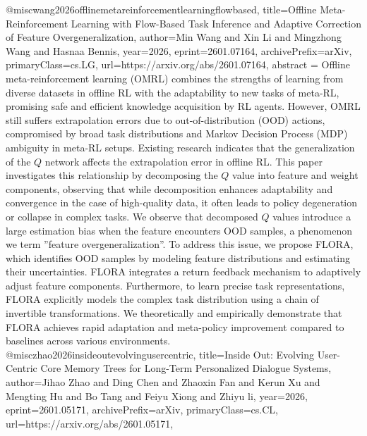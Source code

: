 {}@misc{wang2026offlinemetareinforcementlearningflowbased,
      title={Offline Meta-Reinforcement Learning with Flow-Based Task Inference and Adaptive Correction of Feature Overgeneralization}, 
      author={Min Wang and Xin Li and Mingzhong Wang and Hasnaa Bennis},
      year={2026},
      eprint={2601.07164},
      archivePrefix={arXiv},
      primaryClass={cs.LG},
      url={https://arxiv.org/abs/2601.07164},
      abstract = {Offline meta-reinforcement learning (OMRL) combines the strengths of learning from diverse datasets in offline RL with the adaptability to new tasks of meta-RL, promising safe and efficient knowledge acquisition by RL agents. However, OMRL still suffers extrapolation errors due to out-of-distribution (OOD) actions, compromised by broad task distributions and Markov Decision Process (MDP) ambiguity in meta-RL setups. Existing research indicates that the generalization of the $Q$ network affects the extrapolation error in offline RL. This paper investigates this relationship by decomposing the $Q$ value into feature and weight components, observing that while decomposition enhances adaptability and convergence in the case of high-quality data, it often leads to policy degeneration or collapse in complex tasks. We observe that decomposed $Q$ values introduce a large estimation bias when the feature encounters OOD samples, a phenomenon we term ''feature overgeneralization''. To address this issue, we propose FLORA, which identifies OOD samples by modeling feature distributions and estimating their uncertainties. FLORA integrates a return feedback mechanism to adaptively adjust feature components. Furthermore, to learn precise task representations, FLORA explicitly models the complex task distribution using a chain of invertible transformations. We theoretically and empirically demonstrate that FLORA achieves rapid adaptation and meta-policy improvement compared to baselines across various environments.}
}@misc{zhao2026insideoutevolvingusercentric,
      title={Inside Out: Evolving User-Centric Core Memory Trees for Long-Term Personalized Dialogue Systems}, 
      author={Jihao Zhao and Ding Chen and Zhaoxin Fan and Kerun Xu and Mengting Hu and Bo Tang and Feiyu Xiong and Zhiyu li},
      year={2026},
      eprint={2601.05171},
      archivePrefix={arXiv},
      primaryClass={cs.CL},
      url={https://arxiv.org/abs/2601.05171},
}
